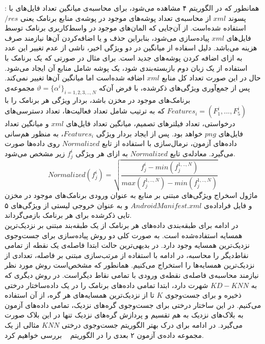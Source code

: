 :  همانطور که در الگوریتم ۴ مشاهده می‌شود، برای محاسبه‌ی میانگین تعداد فایل‌های با پسوند $xml$ از محاسبه‌ی تعداد پوشه‌های موجود در پوشه‌ی منابع برنامک یعنی $/res$ استفاده شده‌است. از آن‌جایی که المان‌های موجود در واسط‌کاربری برنامک توسط فایل‌های $xml$ پیاده‌سازی می‌شود، بنابراین حذف و یا اضافه‌کردن آن‌ها نیازمند صرف هزینه می‌باشد. دلیل اسفاده از میانگین در دو ویژگی اخیر، ناشی از عدم تغییر این عدد به ازای اضافه کردن پوشه‌های جدید است. برای مثال در صورتی که یک برنامک با استفاده از یک زبان دوم بازبسته‌بندی شود، یک پوشه‌ شامل منابع آن ایجاد می‌شود. حال در این صورت تعداد کل منابع $xml$ اضافه شده‌است اما میانگین آن‌ها تغییر نمی‌کند.
پس از جمع‌آوری ویژگی‌های ذکر‌شده، با فرض آن‌که $ \vartheta =\{\alpha ^{i}\}_{i=1,2,3,..,N}$
مجموعه‌ی برنامک‌های موجود در مخزن‌ باشد، بردار ویژگی هر برنامک را با 
$Features_{i} =(F^{i}_{1},...,F^{i}_{5})$
که به ترتیب شامل  تعداد فعالیت‌ها، تعداد دسترسی‌های درخواستی، تعداد فیلتر‌های تصمیم، میانگین تعداد فایل‌های $xml$ و میانگین تعداد فایل‌های $png$ خواهد بود. پس از ایجاد بردار ویژگی $Features_{i}$، به منظور هم‌سانی‌ داده‌های آزمون، نرمال‌سازی با استفاده از تابع $Normalized$ روی داده‌ها صورت می‌گیرد. معادله‌ی تابع $Normalized$ به ازای هر ویژگی $f^{i}_{j}$ زیر مشخص‌ می‌شود.\\
\begin{equation}
Normalized(f^{i}_{j})=\sqrt{\frac{f^{i}_{j}-min(f^{1,..,N}_{j})}{max(f^{1,..,N}_{j})-min(f^{1,..,N}_{j})}}
\end{equation}
ماژول اسخراج ویژگی‌های مبتنی بر منابع به عنوان ورودی برنامک‌های موجود در مخزن و فایل فراداده‌ی $AndroidManifest.xml$ و به عنوان خروجی لیستی از ویژگی‌های ۵ تایی ذکرشده برای هر برنامک بازمی‌گرداند.
\\
در ادامه برای طبقه‌بندی داده‌های هر برنامک از یک طبقه‌بند مبتنی بر نزدیک‌ترین همسایه‌ استفاده‌شده است. به صورت کلی دو روش پیاده‌سازی برای جست‌و‌جوی نزدیک‌ترین همسایه وجود دارد. در بدیهی‌ترین حالت ابتدا فاصله‌ی یک نقطه از تمامی نقاط‌دیگر را محاسبه، در ادامه با استفاده از مرتب‌سازی مبتنی بر فاصله، تعدادی از نزدیک‌ترین همسایه‌ها را استخراج می‌کنیم. همانطور که مشخص‌است روش مورد نظر نیازمند محاسبه‌ی فاصله‌ی نقطه‌ی ورودی با تمامی نقاط دیگر‌است. در روش دیگری که به $KD-KNN$ شهرت دارد، ابتدا تمامی داده‌های برنامک را در یک داده‌ساختار درختی ذخیره و برای جست‌و‌جوی $K$ تا از نزدیک‌ترین همسایه‌های هر گره، از آن استفاده می‌کنیم. در این ساختار درختی برای جست‌و‌جوی گره‌های نزدیک، تمامی داده‌های آزمون به بلاک‌های نزدیک به هم تقسیم و پردازش گره‌های نزدیک‌ تنها در این بلاک صورت می‌گیرد. در ادامه برای درک بهتر الگوریتم جست‌و‌جوی درختی $KNN$ مثالی از یک مجموعه‌ داده‌ی آزمون ۲ بعدی را در الگوریتم ~ بررسی خواهیم کرد. \\

